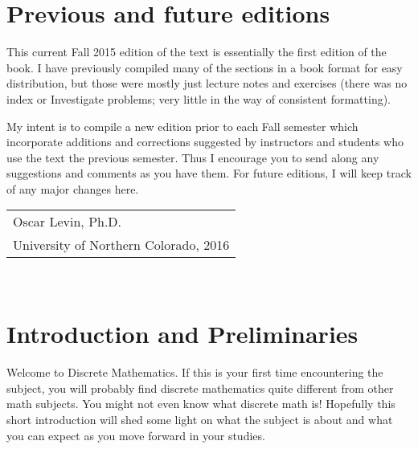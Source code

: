 \documentclass[10pt,]{book}
\theoremstyle{plain}
\theoremstyle{definition}
\theoremstyle{definition}
\theoremstyle{definition}
\begin{document}
\chapter*{Previous and future editions}\label{pref_editions}

This current Fall 2015 edition of the text is essentially the first edition of the book. I have previously compiled many of the sections in a book format for easy distribution, but those were mostly just lecture notes and exercises (there was no index or Investigate problems; very little in the way of consistent formatting).
%
\par

My intent is to compile a new edition prior to each Fall semester which incorporate additions and corrections suggested by instructors and students who use the text the previous semester. Thus I encourage you to send along any suggestions and comments as you have them. For future editions, I will keep track of any major changes here.
%
\par\hfill\begin{tabular}{l@{}}
Oscar Levin, Ph.D.\\
University of Northern Colorado, 2016
\end{tabular}\\\par
\setcounter{tocdepth}{1}
\renewcommand*\contentsname{Contents}
\tableofcontents
\mainmatter
\typeout{************************************************}
\typeout{************************************************}
\chapter[Introduction and Preliminaries]{Introduction and Preliminaries}\label{ch_intro}
\typeout{************************************************}
\typeout{************************************************}

      Welcome to Discrete Mathematics. If this is your first time encountering the subject, you will probably find discrete mathematics quite different from other math subjects. You might not even know what discrete math is! Hopefully this short introduction
      will shed some light on what the subject is about and what you can expect as you move forward in your studies.
\typeout{************************************************}
\typeout{************************************************}
\end{document}
